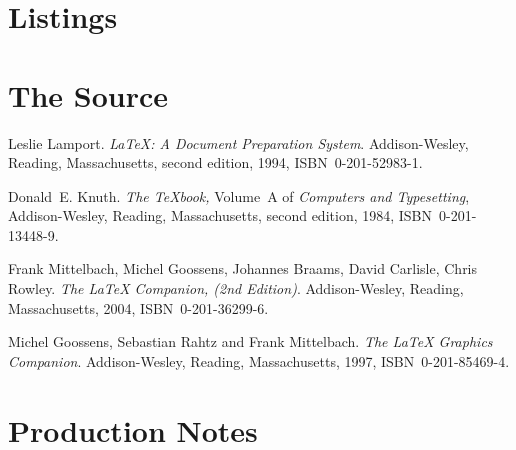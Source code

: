 \documentclass[a4paper,12pt]{book}
\begin{document}
\chapter{Listings}



\chapter{The Source}

{\tiny }


\begin{thebibliography}{99}
 Leslie Lamport.  \newblock \emph{{\LaTeX:} A Document
    Preparation System}.  \newblock Addison-Wesley, Reading,
  Massachusetts, second edition, 1994, ISBN~0-201-52983-1.
  
 Donald~E. Knuth.  \newblock \textit{The \TeX{}book,}
  Volume~A of \textit{Computers and Typesetting}, Addison-Wesley,
  Reading, Massachusetts, second edition, 1984, ISBN~0-201-13448-9.

 Frank Mittelbach, Michel Goossens, Johannes Braams,
  David Carlisle, Chris Rowley.  \newblock \emph{The {\LaTeX} Companion, (2nd
  Edition)}.  \newblock Addison-Wesley, Reading, Massachusetts, 2004,
  ISBN~0-201-36299-6.

 Michel Goossens, Sebastian Rahtz and Frank
  Mittelbach.  \newblock \emph{The {\LaTeX} Graphics Companion}.  \newblock
  Addison-Wesley, Reading, Massachusetts, 1997, ISBN~0-201-85469-4.
 
\end{thebibliography}

\printindex

\backmatter

\chapter{Production Notes}
\end{document}
